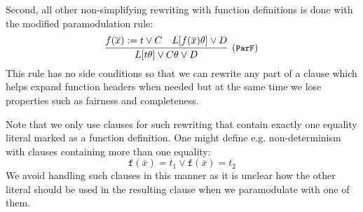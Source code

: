 Second, all other non-simplifying rewriting with function definitions is done with the modified paramodulation rule:
\begin{equation}
\infer[\small{(\texttt{ParF})}]{L[t\theta]\lor C\theta\lor D}{f(\overline{x}):=t\lor C & L[f(\overline{x})\theta]\lor D}
\end{equation}
This rule has no side conditions so that we can rewrite any part of a clause which helps expand function headers when needed but at the same time we lose properties such as fairness and completeness.

Note that we only use clauses for such rewriting that contain exactly one equality literal marked as a function definition. One might define e.g. non-determinism with clauses containing more than one equality:
$$\mathtt{f}(\overline{x})=t_1\lor \mathtt{f}(\overline{x})=t_2$$
We avoid handling such clauses in this manner as it is unclear how the other literal should be used in the resulting clause when we paramodulate with one of them.
